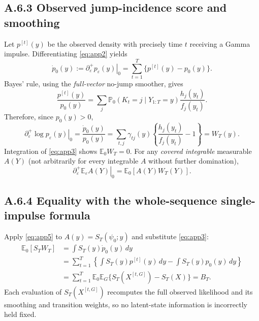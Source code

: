 \documentclass[11pt,a4paper]{article}
\newcommand{\E}{\mathbb E}
\newcommand{\Prb}{\mathbb P}
\newcommand{\eps}{\varepsilon}
\begin{document}
\subsection*{A.6.3 Observed jump-incidence score and smoothing}
Let $p^{[t]}(y)$ be the observed density with precisely time $t$ receiving a Gamma impulse. Differentiating \eqref{eq:app2} yields
\begin{equation}
\dot p_0(y):=\left.\partial_\eps^+p_\eps(y)\right|_0
=\sum_{t=1}^T\{p^{[t]}(y)-p_0(y)\}.\label{eq:app3}
\end{equation}
Bayes' rule, using the \emph{full-vector} no-jump smoother, gives
\begin{equation}
\frac{p^{[t]}(y)}{p_0(y)}=\sum_j\Prb_0(K_t=j\mid Y_{1:T}=y)\frac{h_j(y_t)}{f_j(y_t)}.
\end{equation}
Therefore, since $p_0(y)>0$,
\begin{equation}
\left.\partial_\eps^+\log p_\eps(y)\right|_0=\frac{\dot p_0(y)}{p_0(y)}
=\sum_{t,j}\gamma_{tj}(y)\left\{\frac{h_j(y_t)}{f_j(y_t)}-1\right\}=W_T(y).\label{eq:app4}
\end{equation}
Integration of \eqref{eq:app3} shows $\E_0W_T=0$. For any \emph{covered integrable} measurable $A(Y)$ (not arbitrarily for every integrable $A$ without further domination),
\begin{equation}
\left.\partial_\eps^+\E_\eps A(Y)\right|_0=\E_0[A(Y)W_T(Y)].\label{eq:app5}
\end{equation}
\subsection*{A.6.4 Equality with the whole-sequence single-impulse formula}
Apply \eqref{eq:app5} to $A(y)=S_T(\psi_0;y)$ and substitute \eqref{eq:app3}:
\begin{align}
\E_0[S_TW_T]&=\int S_T(y)\dot p_0(y)\,dy\\
&=\sum_{t=1}^T\left\{\int S_T(y)p^{[t]}(y)\,dy-\int S_T(y)p_0(y)\,dy\right\}\\
&=\sum_{t=1}^T\E_0\E_G\{S_T(X^{[t,G]})-S_T(X)\}=B_T.\label{eq:app6}
\end{align}
Each evaluation of $S_T(X^{[t,G]})$ recomputes the full observed likelihood and its smoothing and transition weights, so no latent-state information is incorrectly held fixed.
\end{document}
